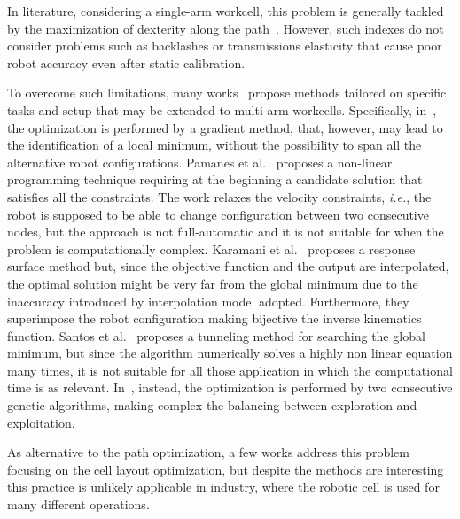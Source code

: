 \documentclass[twocolumn]{svjour3}
\begin{document}
%
In literature, considering a single-arm workcell, this problem is generally tackled by the maximization of dexterity along the path~\cite{Yoshikawa1985,Angeles1992,siciliano2009,legnani2010,LACHNER2020103722}. However, such indexes do not consider problems such as backlashes or transmissions elasticity that cause poor robot accuracy even after static calibration. 

To overcome such limitations, many works~\cite{Feddema1996,Pamanes1991,Kamrani2008,Santos2010,Vosniakos2010} propose methods tailored on specific tasks and setup that may be extended to multi-arm workcells.
%
Specifically, in~\cite{Feddema1996}, the optimization is performed by a gradient method, that, however, may lead to the identification of a local minimum, without the possibility to span all the alternative robot configurations.  
Pamanes et al.~\cite{Pamanes1991} proposes a non-linear programming technique requiring at the beginning a candidate solution that satisfies all the constraints. The work relaxes the velocity constraints, \textit{i.e.}, the robot is supposed to be able to change configuration between two consecutive nodes, but the approach is not full-automatic and it is not suitable for when the problem is computationally complex.
%
Karamani et al.~\cite{Kamrani2008} proposes a response surface method but, since the objective function and the output are interpolated, the optimal solution might be very far from the global minimum due to the inaccuracy introduced by interpolation model adopted. Furthermore, they superimpose the robot configuration making bijective the inverse kinematics function. 
%
Santos et al.~\cite{Santos2010} proposes a tunneling method for searching the global minimum, but since the algorithm numerically solves a highly non linear equation many times, it is not suitable for all those application in which the computational time is as relevant. 
%
In~\cite{Vosniakos2010}, instead, the optimization is performed by two consecutive genetic algorithms, making complex the balancing between exploration and exploitation. 

As alternative to the path optimization, a few works \cite{tay1996optimising,son2019convex} address this problem focusing on the cell layout optimization, but despite the methods are interesting this practice is unlikely applicable in industry, where the robotic cell is used for many different operations.
\end{document}

